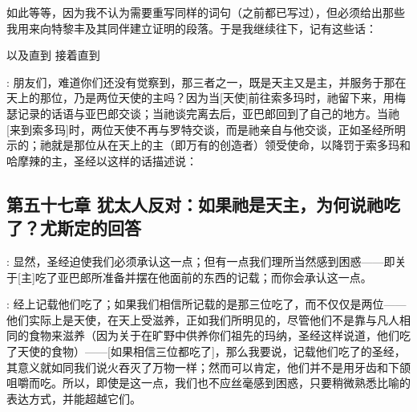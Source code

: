 如此等等，因为我不认为需要重写同样的词句（之前都已写过），但必须给出那些我用来向特黎丰及其同伴建立证明的段落。于是我继续往下，记有这些话：\par

 以及直到 接着直到\par

\par

:  朋友们，难道你们还没有觉察到，那三者之一，既是天主又是主，并服务于那在天上的那位，乃是两位天使的主吗？因为当[天使]前往索多玛时，祂留下来，用梅瑟记录的话语与亚巴郎交谈；当祂谈完离去后，亚巴郎回到了自己的地方。当祂[来到索多玛]时，两位天使不再与罗特交谈，而是祂亲自与他交谈，正如圣经所明示的；祂就是那位从在天上的主（即万有的创造者）领受使命，以降罚于索多玛和哈摩辣的主，圣经以这样的话描述说：\par


\subsection{第五十七章 犹太人反对：如果祂是天主，为何说祂吃了？尤斯定的回答}

:  显然，圣经迫使我们必须承认这一点；但有一点我们理所当然感到困惑——即关于[主]吃了亚巴郎所准备并摆在他面前的东西的记载；而你会承认这一点。\par

: 经上记载他们吃了；如果我们相信所记载的是那三位吃了，而不仅仅是两位——他们实际上是天使，在天上受滋养，正如我们所明见的，尽管他们不是靠与凡人相同的食物来滋养（因为关于在旷野中供养你们祖先的玛纳，圣经这样说道，他们吃了天使的食物）——[如果相信三位都吃了]，那么我要说，记载他们吃了的圣经，其意义就如同我们说火吞灭了万物一样；然而可以肯定，他们并不是用牙齿和下颌咀嚼而吃。所以，即使是这一点，我们也不应丝毫感到困惑，只要稍微熟悉比喻的表达方式，并能超越它们。\par

